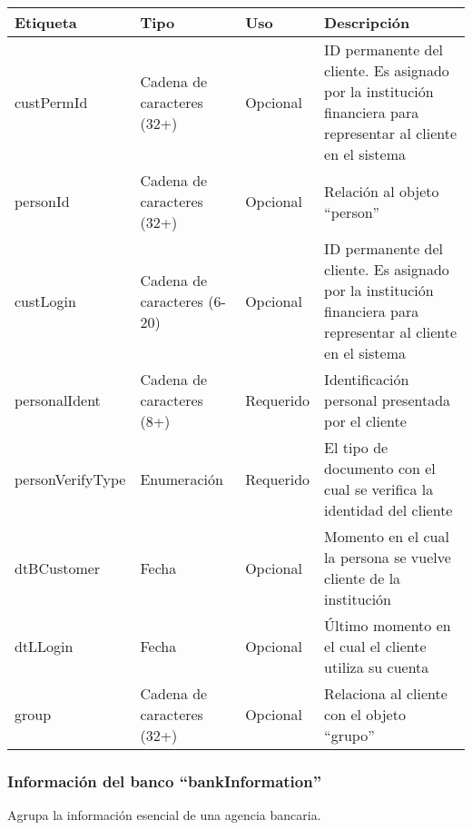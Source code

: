 \begin{center}
\begin{longtable}{|>{\centering\arraybackslash}p{}|>{\centering\arraybackslash}p{}|>{\centering\arraybackslash}p{}|>{\centering\arraybackslash}p{}|}
\hline 
\bfseries {Etiqueta} & \bfseries {Tipo} & \bfseries {Uso} & \bfseries {Descripción} \\ 
\hline 
custPermId & Cadena de caracteres (32+) & Opcional & ID permanente del cliente. Es asignado por la institución financiera para representar al cliente en el sistema \\ 
\hline 
personId & Cadena de caracteres (32+) & Opcional & Relación al objeto ``person'' \\ 
\hline 
custLogin & Cadena de caracteres (6-20) & Opcional & ID permanente del cliente. Es asignado por la institución financiera para representar al cliente en el sistema \\ 
\hline 
personalIdent & Cadena de caracteres (8+) & Requerido & Identificación personal presentada por el cliente \\ 
\hline 
personVerifyType & Enumeración & Requerido & El tipo de documento con el cual se verifica la identidad del cliente \\ 
\hline
dtBCustomer & Fecha & Opcional & Momento en el cual la persona se vuelve cliente de la institución \\ 
\hline
dtLLogin & Fecha & Opcional & Último momento en el cual el cliente utiliza su cuenta \\ 
\hline
group & Cadena de caracteres (32+) & Opcional & Relaciona al cliente con el objeto ``grupo'' \\ 
\hline
\end{longtable}
\end{center}

\subsubsection{Información del banco ``bankInformation''}
Agrupa la información esencial de una agencia bancaria.

